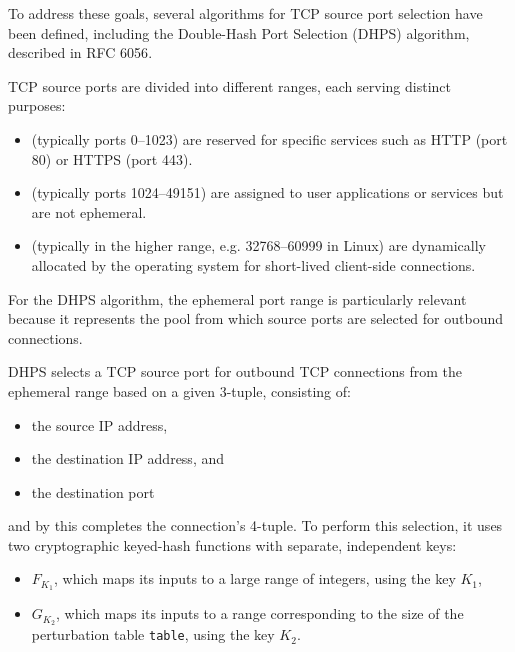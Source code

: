 \documentclass{report}
\begin{document}
To address these goals, several algorithms for TCP source port selection have been defined, including the \alert{Double-Hash Port Selection (DHPS)} algorithm, described in RFC 6056\cite{larsenRecommendationsTransportProtocolPort2011}. %

TCP source ports are divided into different ranges, each serving distinct purposes:
\begin{itemize}
	\item {} (typically ports 0–1023) are reserved for specific services such as HTTP (port 80) or HTTPS (port 443).
	\item {} (typically ports 1024–49151) are assigned to user applications or services but are not ephemeral.
	\item {} (typically in the higher range, e.g. 32768–60999 in Linux) are dynamically allocated by the operating system for short-lived client-side connections.
\end{itemize}

For the DHPS algorithm, the \alert{ephemeral port} range is particularly relevant because it represents the pool from which source ports are selected for outbound connections.

DHPS selects a TCP \alert{source port} for outbound TCP connections from the ephemeral range based on a given \alert{3-tuple}, consisting of:
\begin{itemize}
	\item the \alert{source IP} address,
	\item the \alert{destination IP} address, and
	\item the \alert{destination port}
\end{itemize}
and by this completes the connection’s \alert{4-tuple}. To perform this selection, it uses two \alert{cryptographic keyed-hash functions} with separate, independent keys:
\begin{itemize}
	\item \( F_{K_1} \), which maps its inputs to a large range of integers, using the key \( K_1 \),
	\item \( G_{K_2} \), which maps its inputs to a range corresponding to the size of the \alert{perturbation table} \texttt{table}, using the key \( K_2 \).
\end{itemize}
\end{document}
